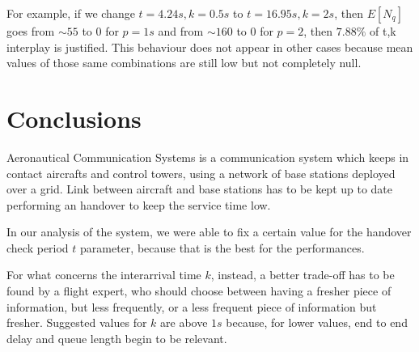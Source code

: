 \documentclass[a4paper,12pt]{article}
\begin{document}
For example, if we change $ t = 4.24s , k = 0.5s $ to $ t = 16.95s , k = 2s $, then $E[N_q]$ goes from $ \sim 55 $ to $0$ for $ p = 1s $ and from $\sim 160 $ to $0$ for $ p = 2 $, then $7.88\%$ of t,k interplay is justified.
This behaviour does not appear in other cases because mean values of those same combinations are still low but not completely null.

\section{Conclusions}
Aeronautical Communication Systems is a communication system which keeps in contact aircrafts and control towers, using a network of base stations deployed over a grid.
Link between aircraft and base stations has to be kept up to date performing an handover to keep the service time low.

In our analysis of the system, we were able to fix a certain value for the handover check period $t$ parameter, because that is the best for the performances.

For what concerns the interarrival time $k$, instead, a better trade-off has to be found by a flight expert, who should choose between having a fresher piece of information, but less frequently, or a less frequent piece of information but fresher.
Suggested values for $k$ are above $1 s$ because, for lower values, end to end delay and queue length begin to be relevant.
\end{document}
